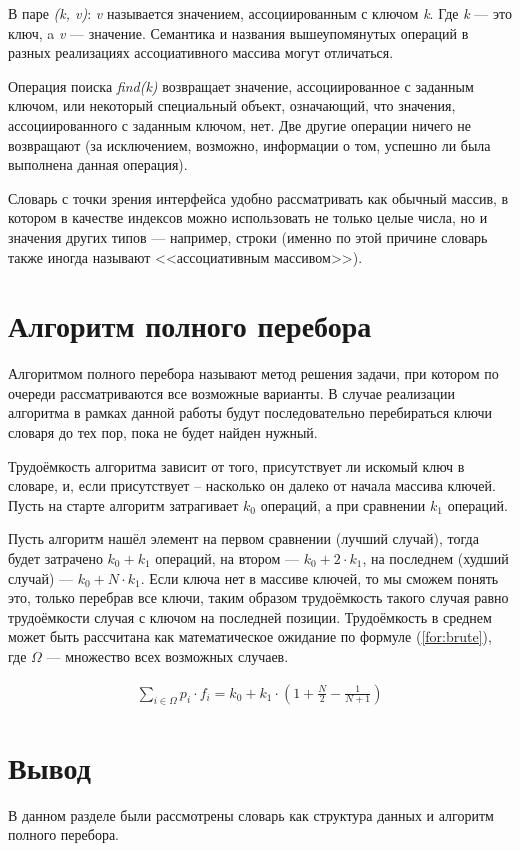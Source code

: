 В паре \textit{(k, v)}: \textit{v} называется значением, ассоциированным с ключом \textit{k}. Где \textit{k} --- это ключ, a \textit{v} — значение. Семантика и названия вышеупомянутых операций в разных реализациях ассоциативного массива могут отличаться.

Операция поиска \textit{find(k)} возвращает значение, ассоциированное с заданным ключом, или некоторый специальный объект, означающий, что значения, ассоциированного с заданным ключом, нет. Две другие операции ничего не возвращают (за исключением, возможно, информации о том, успешно ли была выполнена данная операция).

Словарь с точки зрения интерфейса удобно рассматривать как обычный массив, в котором в качестве индексов можно использовать не только целые числа, но и значения других типов --- например, строки (именно по этой причине словарь также иногда называют <<ассоциативным массивом>>).

\section{Алгоритм полного перебора}
Алгоритмом полного перебора \cite{AI} называют метод решения задачи, при котором по очереди рассматриваются все возможные варианты. В случае реализации алгоритма в рамках данной работы будут последовательно перебираться ключи словаря до тех пор, пока не будет найден нужный.

Трудоёмкость алгоритма зависит от того, присутствует ли искомый ключ в словаре, и, если присутствует -- насколько он далеко от начала массива ключей.
Пусть на старте алгоритм затрагивает $k_{0}$ операций, а при сравнении $k_{1}$ операций.

Пусть алгоритм нашёл элемент на первом сравнении (лучший случай), тогда будет затрачено $k_0 + k_1$ операций, на втором --- $k_0 + 2 \cdot k_1$, на последнем (худший случай) --- $k_0 + N \cdot k_1$. Если ключа нет в массиве ключей, то мы сможем понять это, только перебрав все ключи, таким образом трудоёмкость такого случая равно трудоёмкости случая с ключом на последней позиции. Трудоёмкость в среднем может быть рассчитана как математическое ожидание по формуле (\ref{for:brute}), где $\Omega$ --- множество всех возможных случаев.

\begin{equation}
	\label{for:brute}
	\begin{aligned}
		\sum\limits_{i \in \Omega} p_i \cdot f_i = k_0 + k_1 \cdot \left(1 + \frac{N}{2} - \frac{1}{N + 1}\right)
	\end{aligned}
\end{equation}

\section*{Вывод}
В данном разделе были рассмотрены словарь как структура данных и алгоритм полного перебора.
\clearpage
